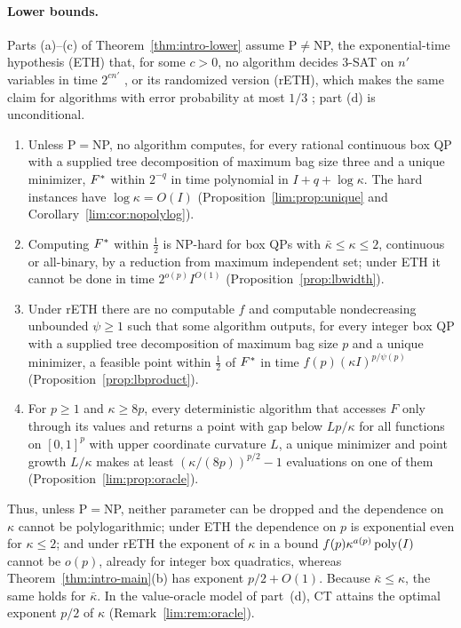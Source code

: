 \paragraph{Lower bounds.}
Parts (a)--(c) of Theorem~\ref{thm:intro-lower} assume P${}\ne{}$NP, the
exponential-time hypothesis (ETH) that, for some $c>0$, no algorithm decides
3-SAT on $n'$ variables in time $2^{cn'}$ \cite{ImpagliazzoPaturiZane2001},
or its randomized version (rETH), which makes the same claim for algorithms
with error probability at most $1/3$ \cite{DellEtAl2014}; part (d) is
unconditional.

\begin{theorem}\label{thm:intro-lower}
\leavevmode
\begin{enumerate}[label=(\alph*)]
\item Unless P${}={}$NP, no algorithm computes, for every rational continuous
box QP with a supplied tree decomposition of maximum bag size three and a
unique minimizer, $F^{*}$ within $2^{-q}$ in time polynomial in
$I+q+\log\kappa$. The hard instances have $\log\kappa=O(I)$
(Proposition~\ref{lim:prop:unique} and Corollary~\ref{lim:cor:nopolylog}).
\item Computing $F^{*}$ within $\frac12$ is NP-hard for box QPs with
$\bar\kappa\le\kappa\le2$, continuous or all-binary, by a reduction from
maximum independent set; under ETH it cannot be done in time
$2^{o(p)}I^{O(1)}$ (Proposition~\ref{prop:lbwidth}).
\item Under rETH there are no computable $f$ and computable nondecreasing
unbounded $\psi\ge1$ such that some algorithm outputs, for every integer box QP
with a supplied tree decomposition of maximum bag size $p$ and a unique
minimizer, a feasible point
within $\frac12$ of $F^{*}$ in time $f(p)(\kappa I)^{p/\psi(p)}$
(Proposition~\ref{prop:lbproduct}).
\item For $p\ge1$ and $\kappa\ge8p$, every deterministic algorithm that
accesses $F$ only through its values and returns a point with gap below
$Lp/\kappa$ for all functions on $[0,1]^p$ with upper coordinate curvature $L$, a
unique minimizer and point growth $L/\kappa$ makes at least
$(\kappa/(8p))^{p/2}-1$ evaluations on one of them
(Proposition~\ref{lim:prop:oracle}).
\end{enumerate}
\end{theorem}

Thus, unless P${}={}$NP, neither parameter can be dropped and the dependence
on $\kappa$ cannot be polylogarithmic; under ETH the dependence on $p$ is
exponential even for $\kappa\le2$; and under rETH the exponent of $\kappa$ in
a bound $f(p)\kappa^{a(p)}\operatorname{poly}(I)$ cannot be $o(p)$, already for integer box
quadratics, whereas Theorem~\ref{thm:intro-main}(b) has exponent $p/2+O(1)$.
Because $\bar\kappa\le\kappa$, the same holds for $\bar\kappa$. In the
value-oracle model of part~(d), CT attains the optimal exponent $p/2$ of
$\kappa$ (Remark~\ref{lim:rem:oracle}).

